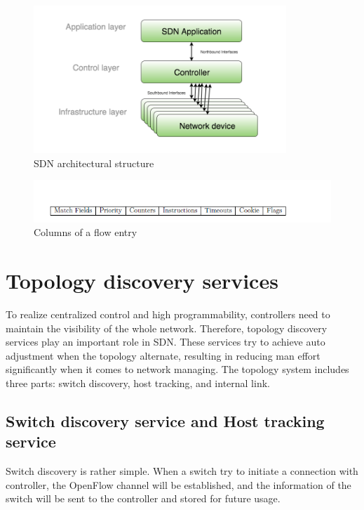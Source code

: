 \begin{figure}[H]
\begin{center} 
\includegraphics[width=0.85\textwidth]{figures/SDN_structure.png}
\end{center}
\caption{SDN architectural structure}
\label{SDN_struct}
\end{figure}

\begin{figure}[H]
\begin{center} 
\includegraphics[width=1\textwidth]{figures/columns_of_flow_entry.png}
\end{center}
\caption{Columns of a flow entry}
\label{FE_Col}
\end{figure}

\section{Topology discovery services}
\label{Topology discovery services}
To realize centralized control and high programmability, controllers need to maintain the visibility of the whole network. Therefore, topology discovery services play an important role in SDN. These services try to achieve auto adjustment when the topology alternate, resulting in reducing man effort significantly when it comes to network managing. The topology system includes three parts: switch discovery, host tracking, and internal link.

\subsection{Switch discovery service and Host tracking service}
Switch discovery is rather simple. When a switch try to initiate a connection with controller, the OpenFlow channel will be established, and the information of the switch will be sent to the controller and stored for future usage. 

